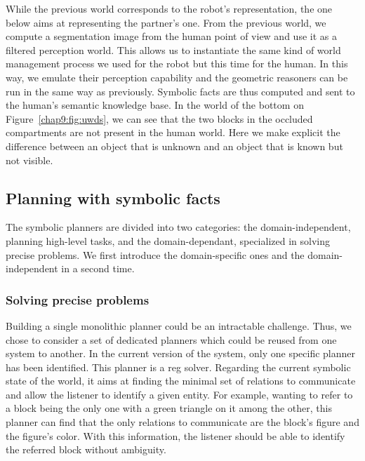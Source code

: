 \documentclass[a4paper,11pt,twoside]{StyleThese}
\begin{document}
While the previous world corresponds to the robot's representation, the one below aims at representing the partner's one. From the previous world, we compute a segmentation image from the human point of view and use it as a filtered perception world. This allows us to instantiate the same kind of world management process we used for the robot but this time for the human. In this way, we emulate their perception capability and the geometric reasoners can be run in the same way as previously. Symbolic facts are thus computed and sent to the human's semantic knowledge base. In the world of the bottom on Figure~\ref{chap9:fig:uwds}, we can see that the two blocks in the occluded compartments are not present in the human world. Here we make explicit the difference between an object that is unknown and an object that is known but not visible.


\subsection{Planning with symbolic facts}

The symbolic planners are divided into two categories: the domain-independent, planning high-level tasks, and the domain-dependant, specialized in solving precise problems. We first introduce the domain-specific ones and the domain-independent in a second time.%

\subsubsection{Solving precise problems}

Building a single monolithic planner could be an intractable challenge. Thus, we chose to consider a set of dedicated planners which could be reused from one system to another. In the current version of the system, only one specific planner has been identified. This planner is a \acrfull{reg} solver. Regarding the current symbolic state of the world, it aims at finding the minimal set of relations to communicate and allow the listener to identify a given entity. For example, wanting to refer to a block being the only one with a green triangle on it among the other, this planner can find that the only relations to communicate are the block's figure and the figure's color. With this information, the listener should be able to identify the referred block without ambiguity.
\end{document}
